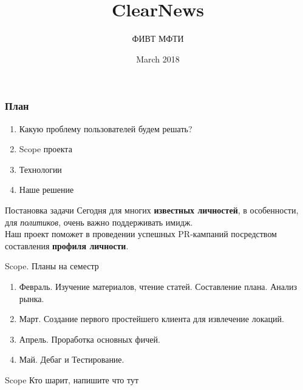 \documentclass[10pt,pdf,hyperref={unicode}]{beamer}
\title{ClearNews}
\author{ФИВТ МФТИ}
\date{March 2018}
\begin{document}
\maketitle
\begin{frame}\frametitle{План}
\begin{enumerate}
    \item Какую проблему пользователей будем решать?
    \item Scope проекта
    \item Технологии
    \item Наше решение
\end{enumerate}
\end{frame}
\begin{frame}{Постановка задачи}
Сегодня для многих \textbf{известных личностей}, в особенности, для \textit{политиков}, очень важно поддерживать имидж. \\Наш проект поможет в проведении успешных PR-кампаний посредством составления \textbf{профиля личности}.
\end{frame}
\begin{frame}{Scope. Планы на семестр}
    \begin{enumerate}
        \item Февраль. Изучение материалов, чтение статей. Составление плана. Анализ рынка.
        \item Март. Создание первого простейшего клиента для извлечение локаций.
        \item Апрель. Проработка основных фичей. 
        \item Май. Дебаг и Тестирование.
    \end{enumerate}
\end{frame}
\begin{frame}{Scope}
Кто шарит, напишите что тут
\end{frame}
\end{document}
